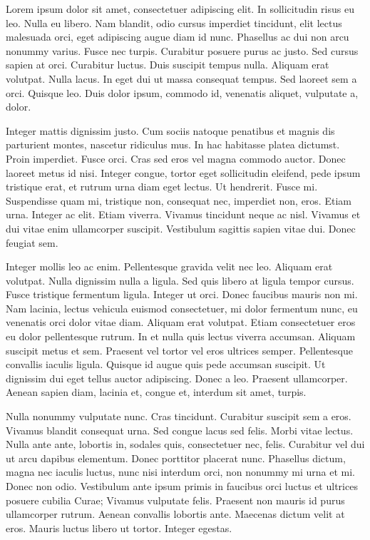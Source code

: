 \documentclass{icldt}
\begin{document}
Lorem ipsum dolor sit amet, consectetuer adipiscing elit. In sollicitudin risus
eu leo. Nulla eu libero. Nam blandit, odio cursus imperdiet tincidunt, elit
lectus malesuada orci, eget adipiscing augue diam id nunc. Phasellus ac dui non
arcu nonummy varius. Fusce nec turpis. Curabitur posuere purus ac justo. Sed
cursus sapien at orci. Curabitur luctus. Duis suscipit tempus nulla. Aliquam
erat volutpat. Nulla lacus. In eget dui ut massa consequat tempus. Sed laoreet
sem a orci. Quisque leo. Duis dolor ipsum, commodo id, venenatis aliquet,
vulputate a, dolor.

Integer mattis dignissim justo. Cum sociis natoque penatibus et magnis dis
parturient montes, nascetur ridiculus mus. In hac habitasse platea dictumst.
Proin imperdiet. Fusce orci. Cras sed eros vel magna commodo auctor. Donec
laoreet metus id nisi. Integer congue, tortor eget sollicitudin eleifend, pede
ipsum tristique erat, et rutrum urna diam eget lectus. Ut hendrerit. Fusce mi.
Suspendisse quam mi, tristique non, consequat nec, imperdiet non, eros. Etiam
urna. Integer ac elit. Etiam viverra. Vivamus tincidunt neque ac nisl. Vivamus
et dui vitae enim ullamcorper suscipit. Vestibulum sagittis sapien vitae dui.
Donec feugiat sem.

Integer mollis leo ac enim. Pellentesque gravida velit nec leo. Aliquam erat
volutpat. Nulla dignissim nulla a ligula. Sed quis libero at ligula tempor
cursus. Fusce tristique fermentum ligula. Integer ut orci. Donec faucibus mauris
non mi. Nam lacinia, lectus vehicula euismod consectetuer, mi dolor fermentum
nunc, eu venenatis orci dolor vitae diam. Aliquam erat volutpat. Etiam
consectetuer eros eu dolor pellentesque rutrum. In et nulla quis lectus viverra
accumsan. Aliquam suscipit metus et sem. Praesent vel tortor vel eros ultrices
semper. Pellentesque convallis iaculis ligula. Quisque id augue quis pede
accumsan suscipit. Ut dignissim dui eget tellus auctor adipiscing. Donec a leo.
Praesent ullamcorper. Aenean sapien diam, lacinia et, congue et, interdum sit
amet, turpis.

Nulla nonummy vulputate nunc. Cras tincidunt. Curabitur suscipit sem a eros.
Vivamus blandit consequat urna. Sed congue lacus sed felis. Morbi vitae lectus.
Nulla ante ante, lobortis in, sodales quis, consectetuer nec, felis. Curabitur
vel dui ut arcu dapibus elementum. Donec porttitor placerat nunc. Phasellus
dictum, magna nec iaculis luctus, nunc nisi interdum orci, non nonummy mi urna
et mi. Donec non odio. Vestibulum ante ipsum primis in faucibus orci luctus et
ultrices posuere cubilia Curae; Vivamus vulputate felis. Praesent non mauris id
purus ullamcorper rutrum. Aenean convallis lobortis ante. Maecenas dictum velit
at eros. Mauris luctus libero ut tortor. Integer egestas.
\end{document}
